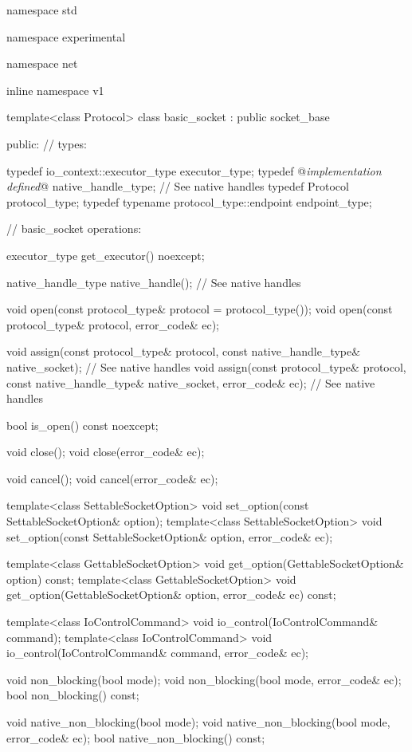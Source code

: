 \begin{codeblock}
namespace std {
namespace experimental {
namespace net {
inline namespace v1 {

  template<class Protocol>
  class basic_socket : public socket_base
  {
  public:
    // types:

    typedef io_context::executor_type executor_type;
    typedef @\textit{implementation defined}@ native_handle_type; // See native handles
    typedef Protocol protocol_type;
    typedef typename protocol_type::endpoint endpoint_type;

    // basic_socket operations:

    executor_type get_executor() noexcept;

    native_handle_type native_handle(); // See native handles

    void open(const protocol_type& protocol = protocol_type());
    void open(const protocol_type& protocol, error_code& ec);

    void assign(const protocol_type& protocol,
                const native_handle_type& native_socket); // See native handles
    void assign(const protocol_type& protocol,
                const native_handle_type& native_socket,
                error_code& ec); // See native handles

    bool is_open() const noexcept;

    void close();
    void close(error_code& ec);

    void cancel();
    void cancel(error_code& ec);

    template<class SettableSocketOption>
      void set_option(const SettableSocketOption& option);
    template<class SettableSocketOption>
      void set_option(const SettableSocketOption& option, error_code& ec);

    template<class GettableSocketOption>
      void get_option(GettableSocketOption& option) const;
    template<class GettableSocketOption>
      void get_option(GettableSocketOption& option, error_code& ec) const;

    template<class IoControlCommand>
      void io_control(IoControlCommand& command);
    template<class IoControlCommand>
      void io_control(IoControlCommand& command, error_code& ec);

    void non_blocking(bool mode);
    void non_blocking(bool mode, error_code& ec);
    bool non_blocking() const;

    void native_non_blocking(bool mode);
    void native_non_blocking(bool mode, error_code& ec);
    bool native_non_blocking() const;

}}}}}
\end{codeblock}
